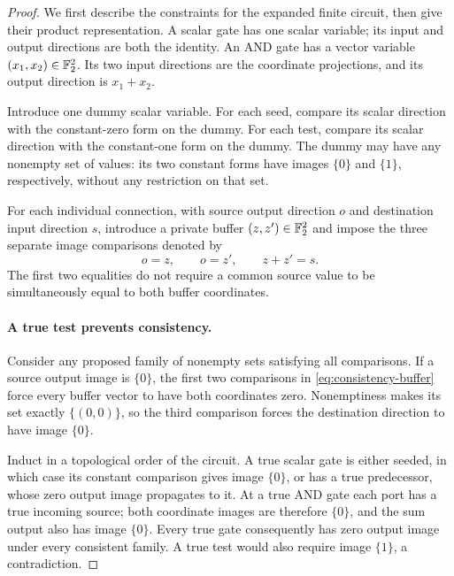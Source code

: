 \begin{proof}
We first describe the constraints for the expanded finite circuit, then
give their product representation. A scalar gate has one scalar variable;
its input and output directions are both the identity. An AND gate has
a vector variable $(x_1,x_2)\in\mathbb F_2^2$. Its two input directions are the
coordinate projections, and its output direction is $x_1+x_2$.

Introduce one dummy scalar variable. For each seed, compare its scalar
direction with the constant-zero form on the dummy. For each test, compare
its scalar direction with the constant-one form on the dummy. The dummy
may have any nonempty set of values: its two constant forms have images
$\{0\}$ and $\{1\}$, respectively, without any restriction on that set.

For each individual connection, with source output direction $o$ and
destination input direction $s$, introduce a private buffer
$(z,z')\in\mathbb F_2^2$ and impose the three separate image comparisons denoted by
\begin{equation}\label{eq:consistency-buffer}
 o=z,\qquad o=z',\qquad z+z'=s.
\end{equation}
The first two equalities do not require a common source value to be
simultaneously equal to both buffer coordinates.

\paragraph{A true test prevents consistency.}
Consider any proposed family of nonempty sets satisfying all comparisons.
If a source output image is $\{0\}$, the first two comparisons in
\eqref{eq:consistency-buffer} force every buffer vector to have both
coordinates zero. Nonemptiness makes its set exactly $\{(0,0)\}$, so
the third comparison forces the destination direction to have image
$\{0\}$.

Induct in a topological order of the circuit. A true scalar gate is either
seeded, in which case its constant comparison gives image $\{0\}$, or
has a true predecessor, whose zero output image propagates to it. At a
true AND gate each port has a true incoming source; both coordinate images
are therefore $\{0\}$, and the sum output also has image $\{0\}$.
Every true gate consequently has zero output image under every consistent
family. A true test would also require image $\{1\}$, a contradiction.


\end{proof}

